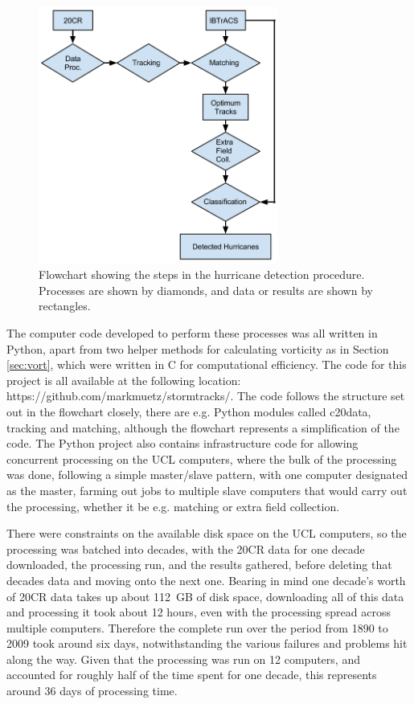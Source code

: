 \documentclass[pdftex,12pt,a4paper]{report}
\begin{document}
\begin{figure}[ht!]
    \centering
    \includegraphics[width=0.7\textwidth]{figures/hurricane_detection_procedure}
    \caption{Flowchart showing the steps in the hurricane detection procedure. Processes are shown
    by diamonds, and data or results are shown by rectangles. }
    \label{fig:hurricane_detection_proc}
\end{figure}

\newpage
The computer code developed to perform these processes was all written in Python, apart from two
helper methods for calculating vorticity as in Section \ref{sec:vort}, which were written in C for
computational efficiency. The code for this project is all available at the following location:
https://github.com/markmuetz/stormtracks/. The code follows the structure set out in the flowchart
closely, there are e.g. Python modules called c20data, tracking and matching, although the flowchart
represents a simplification of the code. The Python project also contains infrastructure code for
allowing concurrent processing on the UCL computers, where the bulk of the processing was done,
following a simple master/slave pattern, with one computer designated as the master, farming out
jobs to multiple slave computers that would carry out the processing, whether it be e.g. matching or
extra field collection. 

There were constraints on the available disk space on the UCL computers, so the
processing was batched into decades, with the 20CR data for one decade downloaded, the processing
run, and the results gathered, before deleting that decades data and moving onto the next one.
Bearing in mind one decade's worth of 20CR data takes up about \SI{112}{GB} of disk space,
downloading all of this data and processing it took about 12 hours, even with the processing spread
across multiple computers. Therefore the complete run over the period from 1890 to 2009 took around
six days, notwithstanding the various failures and problems hit along the way. Given that the
processing was run on 12 computers, and accounted for roughly half of the time spent for one decade,
this represents around 36 days of processing time.
\end{document}
